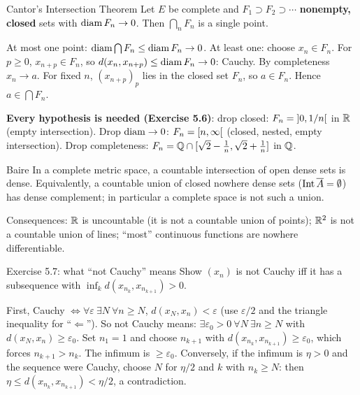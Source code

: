 \begin{thm}{Cantor's Intersection Theorem}
Let $E$ be complete and $F_1\supset F_2\supset\cdots$ \textbf{nonempty, closed} sets with
$\operatorname{diam} F_n\to0$. Then $\bigcap_nF_n$ is a single point.
\end{thm}
\begin{answer}
At most one point: $\operatorname{diam}\bigcap F_n\le\operatorname{diam} F_n\to0$. At least one: choose $x_n\in F_n$. For
$p\ge0$, $x_{n+p}\in F_n$, so $d(x_n,x_{n+p})\le\operatorname{diam} F_n\to0$: Cauchy. By completeness
$x_n\to a$. For fixed $n$, $(x_{n+p})_p$ lies in the closed set $F_n$, so $a\in F_n$. Hence
$a\in\bigcap F_n$.
\end{answer}
\textbf{Every hypothesis is needed (Exercise 5.6)}: drop closed: $F_n=\mathopen{]}0,1/n\mathclose{[}$ in $\mathbb R$ (empty
intersection). Drop $\operatorname{diam}\to0$: $F_n=\mathopen{[}n,\infty\mathclose{[}$ (closed, nested, empty intersection). Drop
completeness: $F_n=\mathbb Q\cap[\sqrt2-\frac1n,\sqrt2+\frac1n]$ in $\mathbb Q$.

\begin{thm}{Baire}
In a complete metric space, a countable intersection of open dense sets is dense. Equivalently,
a countable union of closed nowhere dense sets ($\operatorname{Int}\overline{A}=\emptyset$) has dense complement; in
particular a complete space is not such a union.
\end{thm}
Consequences: $\mathbb R$ is uncountable (it is not a countable union of points); $\mathbb R^2$ is not a
countable union of lines; ``most'' continuous functions are nowhere differentiable.

\begin{exam}{Exercise 5.7: what ``not Cauchy'' means}
Show $(x_n)$ is not Cauchy iff it has a subsequence with $\inf_kd(x_{n_k},x_{n_{k+1}})>0$.
\end{exam}
\begin{answer}
First, Cauchy $\iff\forall\varepsilon\ \exists N\ \forall n\ge N$, $d(x_N,x_n)<\varepsilon$
(use $\varepsilon/2$ and the triangle inequality for ``$\Leftarrow$''). So not Cauchy means:
$\exists\varepsilon_0>0\ \forall N\ \exists n\ge N$ with $d(x_N,x_n)\ge\varepsilon_0$. Set $n_1=1$
and choose $n_{k+1}$ with $d(x_{n_k},x_{n_{k+1}})\ge\varepsilon_0$, which forces
$n_{k+1}>n_k$. The infimum is $\ge\varepsilon_0$. Conversely, if the infimum is $\eta>0$ and
the sequence were Cauchy, choose $N$ for $\eta/2$ and $k$ with $n_k\ge N$: then
$\eta\le d(x_{n_k},x_{n_{k+1}})<\eta/2$, a contradiction.
\end{answer}

